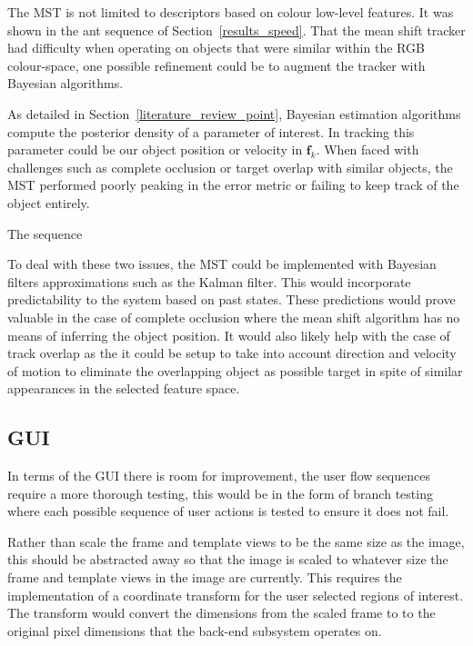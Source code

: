 The MST is not limited to descriptors based on colour low-level
features. It was shown in the ant sequence of Section~\ref{results_speed}. That
the mean shift tracker had difficulty when operating on objects that were
similar within the RGB colour-space, one possible refinement could be to augment
the tracker with Bayesian algorithms.

As detailed in Section~\ref{literature_review_point}, Bayesian estimation
algorithms compute the posterior density of a parameter of interest. In tracking
this parameter could be our object position or velocity in $\mathbf{f}_k$. 
When faced with challenges such as complete occlusion or target overlap with
similar objects, the MST performed poorly peaking in the error metric or failing
to keep track of the object entirely.

The sequence

To deal with these two issues, the MST could be implemented with Bayesian
filters approximations such as the Kalman filter. This would incorporate predictability 
to the system based on past states. These predictions would prove valuable in the
case of complete occlusion where the mean shift algorithm has no means of
inferring the object position. It would also likely help with the case of
track overlap as the it could be setup to take into account direction and
velocity of motion to eliminate the overlapping object as possible target in
spite of similar appearances in the selected feature space.


\subsection{GUI}
In terms of the GUI there is room for improvement, the user flow sequences
require a more thorough testing, this would be in the form of branch testing where
each possible sequence of user actions is tested to ensure it does not fail.

Rather than scale the frame and template views to be the same size as the image,
this should be abstracted away so that the image is scaled to whatever size the
frame and template views in the image are currently. This requires the
implementation of a coordinate transform for the user selected regions of
interest. The transform would convert the dimensions from the scaled frame to
to the original pixel dimensions that the back-end subsystem operates on.




